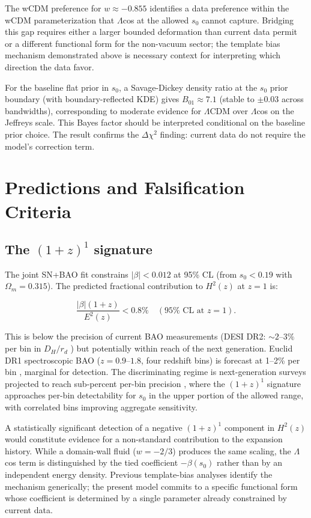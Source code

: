 \documentclass[
  aps,
  prd,
  onecolumn,         %
  nofootinbib,
  longbibliography
]{revtex4-2}
\begin{document}
The wCDM preference for $w \approx -0.855$ identifies a data preference within the wCDM parameterization that $\Lambda$cos at the allowed $s_0$ cannot
capture. Bridging this gap requires either a larger bounded deformation
than current data permit or a different functional form for the
non-vacuum sector; the template bias mechanism demonstrated above is necessary context for interpreting
which direction the data favor.


For the baseline flat prior in $s_0$, a Savage-Dickey density ratio at the
$s_0$ prior boundary (with boundary-reflected KDE) gives $B_{01} \approx 7.1$ (stable
to $\pm 0.03$ across bandwidths), corresponding to moderate evidence for $\Lambda$CDM
over $\Lambda$cos on the Jeffreys scale. This Bayes factor should be interpreted
conditional on the baseline prior choice. The result confirms the $\Delta\chi^2$
finding: current data do not require the model's correction term.

\section{Predictions and Falsification Criteria}\label{sec:predictions}

\subsection{The $(1+z)^1$ signature}\label{sec:1z-signature}

The joint SN+BAO fit constrains $|\beta| < 0.012$
at 95\% CL (from $s_0 < 0.19$ with $\Omega_m = 0.315$). The predicted
fractional contribution to $H^2(z)$ at $z = 1$ is:

\[\frac{|\beta|(1+z)}{E^2(z)} < 0.8\% \quad (95\% \text{ CL at } z = 1).\]

This is below the precision of current BAO measurements (DESI DR2:
${\sim}2$--$3\%$ per bin in $D_H/r_d$ \cite{ref1}) but potentially within reach
of the next generation. Euclid DR1 spectroscopic BAO ($z = 0.9$--$1.8$, four
redshift bins) is forecast at 1--2\% per bin \cite{ref16}, marginal for
detection. The discriminating regime is next-generation surveys projected
to reach sub-percent per-bin precision \cite{ref16,ref17}, where the
$(1+z)^1$ signature approaches per-bin detectability for $s_0$ in the
upper portion of the allowed range, with correlated bins improving
aggregate sensitivity.

A statistically significant detection of a negative $(1+z)^1$ component in
$H^2(z)$ would constitute evidence for a non-standard contribution to the
expansion history. While a domain-wall fluid ($w = -2/3$) produces the
same scaling, the $\Lambda$cos term is distinguished by the tied coefficient
$-\beta(s_0)$ rather than by an independent energy density. Previous
template-bias analyses identify the mechanism generically; the present
model commits to a specific functional form whose coefficient is
determined by a single parameter already constrained by current data.
\end{document}
